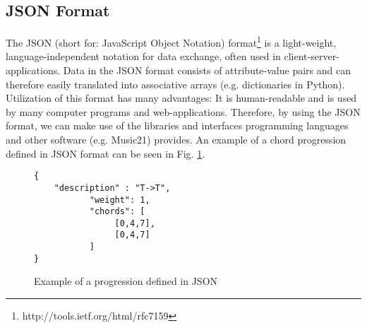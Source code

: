 \subsection{JSON Format}
The JSON (short for: JavaScript Object Notation) format\footnote{http://tools.ietf.org/html/rfc7159} is a light-weight, language-independent notation for data exchange, often used in client-server-applications. Data in the JSON format consists of attribute-value pairs and can therefore easily translated into associative arrays (e.g. dictionaries in Python). Utilization of this format has many advantages: It is human-readable and is used by many computer programs and web-applications. Therefore, by using the JSON format, we can make use of the libraries and interfaces programming languages and other software (e.g. Music21) provides. An example of a chord progression defined in JSON format can be seen in Fig. \ref{fig:jsonex}.

\begin{figure}
\centering
\begin{verbatim}
{
	"description" : "T->T",
           "weight": 1,
           "chords": [
                [0,4,7],
                [0,4,7]
           ]
}
\end{verbatim}
\caption{Example of a progression defined in JSON}
\label{fig:jsonex}
\end{figure}